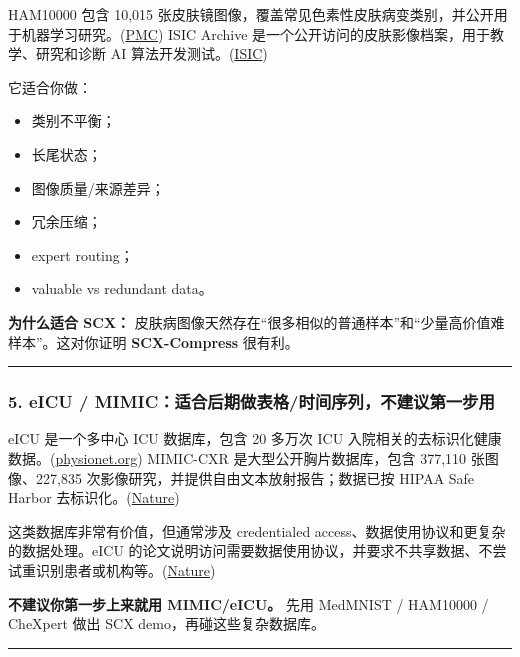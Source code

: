 \documentclass[
  12pt,
]{ctexart}
\providecommand{\tightlist}{%
  \setlength{\itemsep}{0pt}\setlength{\parskip}{0pt}}
\begin{document}
HAM10000 包含 10,015
张皮肤镜图像，覆盖常见色素性皮肤病变类别，并公开用于机器学习研究。(\href{https://github.com/princeton-nlp/LESS?utm_source=chatgpt.com}{PMC})
ISIC Archive 是一个公开访问的皮肤影像档案，用于教学、研究和诊断 AI
算法开发测试。(\href{https://arxiv.org/abs/2411.15594?utm_source=chatgpt.com}{ISIC})

它适合你做：

\begin{itemize}
\tightlist
\item
  类别不平衡；
\item
  长尾状态；
\item
  图像质量/来源差异；
\item
  冗余压缩；
\item
  expert routing；
\item
  valuable vs redundant data。
\end{itemize}

\textbf{为什么适合 SCX：}
皮肤病图像天然存在``很多相似的普通样本''和``少量高价值难样本''。这对你证明
\textbf{SCX-Compress} 很有利。

\begin{center}\rule{0.5\linewidth}{0.5pt}\end{center}

\subsubsection{5. eICU /
MIMIC：适合后期做表格/时间序列，不建议第一步用}\label{eicu-mimicux9002ux5408ux540eux671fux505aux8868ux683cux65f6ux95f4ux5e8fux5217ux4e0dux5efaux8baeux7b2cux4e00ux6b65ux7528}

eICU 是一个多中心 ICU 数据库，包含 20 多万次 ICU
入院相关的去标识化健康数据。(\href{https://arxiv.org/abs/2409.11239?utm_source=chatgpt.com}{physionet.org})
MIMIC-CXR 是大型公开胸片数据库，包含 377,110 张图像、227,835
次影像研究，并提供自由文本放射报告；数据已按 HIPAA Safe Harbor
去标识化。(\href{https://arxiv.org/abs/2406.11794?utm_source=chatgpt.com}{Nature})

这类数据库非常有价值，但通常涉及 credentialed
access、数据使用协议和更复杂的数据处理。eICU
的论文说明访问需要数据使用协议，并要求不共享数据、不尝试重识别患者或机构等。(\href{https://www.datacomp.ai/dclm/?utm_source=chatgpt.com}{Nature})

\textbf{不建议你第一步上来就用 MIMIC/eICU。} 先用 MedMNIST / HAM10000 /
CheXpert 做出 SCX demo，再碰这些复杂数据库。

\begin{center}\rule{0.5\linewidth}{0.5pt}\end{center}
\end{document}

